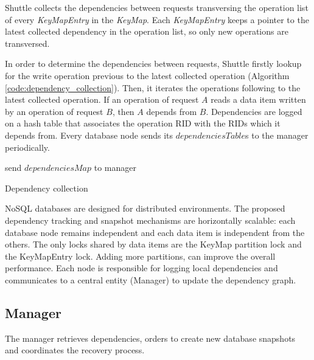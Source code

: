 Shuttle collects the dependencies between requests transversing the operation list of every \emph{KeyMapEntry} in the \emph{KeyMap}. Each \emph{KeyMapEntry} keeps a pointer to the latest collected dependency in the operation list, so only new operations are transversed.

In order to determine the dependencies between requests, Shuttle firstly lookup for the write operation previous to the latest collected operation (Algorithm \ref{code:dependency_collection}). Then, it iterates the operations following to the latest collected operation. If an operation of request $A$ reads a data item written by an operation of request $B$, then $A$ depends from $B$. Dependencies are logged on a hash table that associates the operation \ac{RID} with the \ac{RID}s which it depends from. Every database node sends its $dependenciesTable$s to the manager periodically. 

 
\begin{algorithm}[H]
\DontPrintSemicolon{}
	\;
	\BlankLine
	\BlankLine
	send $dependenciesMap$ to manager\;

 \caption{Dependency collection}
\label{code:dependency_collection}
\end{algorithm}


\acs{NoSQL} databases are designed for distributed environments. The proposed dependency tracking and snapshot mechanisms are horizontally scalable: each database node remains independent and each data item is independent from the others. The only locks shared by data items are the KeyMap partition lock and the KeyMapEntry lock. Adding more partitions, can improve the overall performance. Each node is responsible for logging local dependencies and communicates to a central entity (Manager) to update the  dependency graph. 


\subsection{Manager}\label{sec:impl:normal:manager}
The manager retrieves dependencies, orders to create new database snapshots and coordinates the recovery process. 

